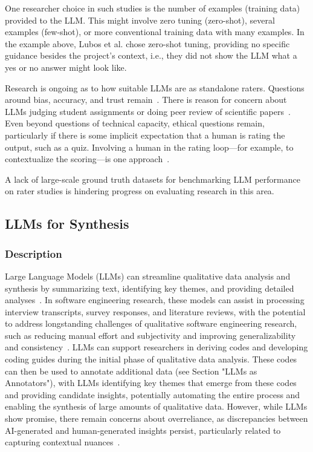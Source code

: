 One researcher choice in such studies is the number of examples (training data) provided to the LLM. This might involve zero tuning (zero-shot), several examples (few-shot), or more conventional training data with many examples. In the example above, Lubos et al. chose zero-shot tuning, providing no specific guidance besides the project's context, i.e., they did not show the LLM what a yes or no answer might look like. 

Research is ongoing as to how suitable LLMs are as standalone raters. Questions around bias, accuracy, and trust remain~\cite{DBLP:journals/corr/abs-2406-18403}. There is reason for concern about LLMs judging student assignments or doing peer review of scientific papers~\cite{DBLP:conf/coling/ZhouC024}. Even beyond questions of technical capacity, ethical questions remain, particularly if there is some implicit expectation that a human is rating the output, such as a quiz. Involving a human in the rating loop---for example, to contextualize the scoring---is one approach~\cite{panHumanCenteredDesignRecommendations2024}. 

A lack of large-scale ground truth datasets for benchmarking LLM performance on rater studies is hindering progress on evaluating research in this area.

\subsection{LLMs for Synthesis}

\subsubsection{Description}

Large Language Models (LLMs) can streamline qualitative data analysis and synthesis by summarizing text, identifying key themes, and providing detailed analyses~\cite{DBLP:conf/chi/ByunVS23}. In software engineering research, these models can assist in processing interview transcripts, survey responses, and literature reviews, with the potential to address longstanding challenges of qualitative software engineering research, such as reducing manual effort and subjectivity and improving generalizability and consistency~\cite{DBLP:journals/ase/BanoHZT24}. LLMs can support researchers in deriving codes and developing coding guides during the initial phase of qualitative data analysis. These codes can then be used to annotate additional data (see Section "LLMs as Annotators"), with LLMs identifying key themes that emerge from these codes and providing candidate insights, potentially automating the entire process and enabling the synthesis of large amounts of qualitative data. However, while LLMs show promise, there remain concerns about overreliance, as discrepancies between AI-generated and human-generated insights persist, particularly related to capturing contextual nuances~\cite{bano2023exploringqualitativeresearchusing}.

